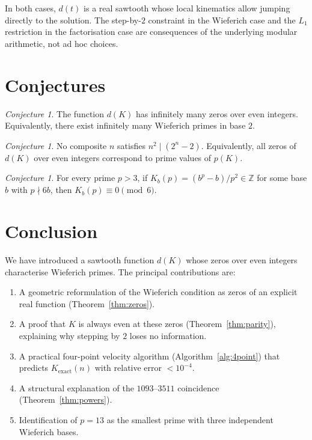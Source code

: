 \documentclass[12pt,a4paper]{article}
\theoremstyle{definition}
\theoremstyle{remark}
\newtheorem{conjecture}[theorem]{Conjecture}
\newcommand{\Z}{\mathbb{Z}}
\newcommand{\Kex}{K_{\mathrm{exact}}}
\begin{document}
In both cases, $d(t)$ is a real sawtooth whose local kinematics allow
jumping directly to the solution. The step-by-$2$ constraint in the
Wieferich case and the $L_1$ restriction in the factorisation case are
consequences of the underlying modular arithmetic, not ad hoc choices.

\section{Conjectures}
\label{sec:conjectures}

\begin{conjecture}\label{conj:infinitely-many}
The function $d(K)$ has infinitely many zeros over even integers.
Equivalently, there exist infinitely many Wieferich primes in base $2$.
\end{conjecture}

\begin{conjecture}\label{conj:no-composite}
No composite $n$ satisfies $n^2 \mid (2^n - 2)$. Equivalently, all
zeros of $d(K)$ over even integers correspond to prime values of $p(K)$.
\end{conjecture}

\begin{conjecture}\label{conj:mod6}
For every prime $p > 3$, if $K_b(p) = (b^p - b)/p^2 \in \Z$ for some
base $b$ with $p \nmid 6b$, then $K_b(p) \equiv 0 \pmod{6}$.
\end{conjecture}

\section{Conclusion}
\label{sec:conclusion}

We have introduced a sawtooth function $d(K)$ whose zeros over even
integers characterise Wieferich primes. The principal contributions are:

\begin{enumerate}[label=(\roman*)]
  \item A geometric reformulation of the Wieferich condition as zeros of
        an explicit real function (Theorem~\ref{thm:zeros}).
  \item A proof that $K$ is always even at these zeros
        (Theorem~\ref{thm:parity}), explaining why stepping by $2$
        loses no information.
  \item A practical four-point velocity algorithm (Algorithm~\ref{alg:4point})
        that predicts $\Kex(n)$ with relative error $< 10^{-4}$.
  \item A structural explanation of the $1093$--$3511$ coincidence
        (Theorem~\ref{thm:powers}).
  \item Identification of $p=13$ as the smallest prime with three
        independent Wieferich bases.
\end{enumerate}
\end{document}
